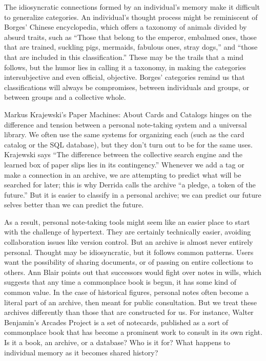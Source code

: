 The idiosyncratic connections formed by an individual’s memory make it difficult to generalize categories. An individual’s thought process might be reminiscent of Borges’ Chinese encyclopedia, which offers a taxonomy of animals divided by absurd traits, such as “Those that belong to the emperor, embalmed ones, those that are trained, suckling pigs, mermaids, fabulous ones, stray dogs,” and “those that are included in this classification.”  These may be the trails that a mind follows, but the humor lies in calling it a taxonomy, in making the categories intersubjective and even official, objective. Borges’ categories remind us that classifications will always be compromises, between individuals and groups, or between groups and a collective whole.

Markus Krajewski’s Paper Machines: About Cards and Catalogs hinges on the difference and tension between a personal note-taking system and a universal library. We often use the same systems for organizing each (such as the card catalog or the SQL database), but they don’t turn out to be for the same uses. Krajewski says “The difference between the collective search engine and the learned box of paper slips lies in its contingency.”  Whenever we add a tag or make a connection in an archive, we are attempting to predict what will be searched for later; this is why Derrida calls the archive “a pledge, a token of the future.”  But it is easier to classify in a personal archive; we can predict our future selves better than we can predict the future.

As a result, personal note-taking tools might seem like an easier place to start with the challenge of hypertext. They are certainly technically easier, avoiding collaboration issues like version control. But an archive is almost never entirely personal. Thought may be idiosyncratic, but it follows common patterns. Users want the possibility of sharing documents, or of passing on entire collections to others. Ann Blair points out that successors would fight over notes in wills, which suggests that any time a commonplace book is begun, it has some kind of common value.  In the case of historical figures, personal notes often become a literal part of an archive, then meant for public consultation. But we treat these archives differently than those that are constructed for us. For instance, Walter Benjamin’s Arcades Project is a set of notecards, published as a sort of commonplace book that has become a prominent work to consult in its own right. Is it a book, an archive, or a database? Who is it for? What happens to individual memory as it becomes shared history?

